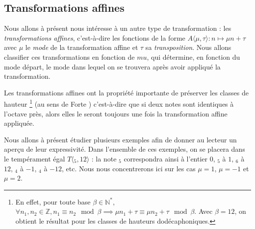 \subsection{Transformations affines}

Nous allons à présent nous intéresse à un autre type de transformation : les \emph{transformations affines}, c'est-à-dire les fonctions de la forme $A\langle\mu,\tau\rangle : n \mapsto \mu n + \tau$ avec $\mu$ le \emph{mode} de la transformation affine et $\tau$ sa \emph{transposition}. Nous allons classifier ces transformations en fonction de $mu$, qui détermine, en fonction du mode départ, le mode dans lequel on se trouvera après avoir appliqué la transformation. 

Les transformations affines ont la propriété importante de préserver les classes de hauteur \footnote{En effet, pour toute base $\beta\in \mathbb{N}^*$, $\forall n_1,n_2 \in \mathbb{Z}, n_1 \equiv n_2 \mod \beta \implies \mu n_1 + \tau \equiv \mu n_2 + \tau \mod \beta$. Avec $\beta=12$, on obtient le résultat pour les classes de hauteurs dodécaphoniques. }  (au sens de Forte \cite{forte1973structure}) c'est-à-dire que si deux notes sont identiques à l'octave près, alors elles le seront toujours une fois la transformation affine appliquée. 

Nous allons à présent étudier plusieurs exemples afin de donner au lecteur un aperçu de leur expressivité. Dans l'ensemble de ces exemples, on se placera dans le tempérament égal $T\langle $$_5,12\rangle$ : la note $_5$ correspondra ainsi à l'entier $0$, $_5$ à $1$, $_6$ à $12$, $_4$ à $-1$, $_4$ à $-12$, etc. Nous nous concentrerons ici sur les cas $\mu = 1$, $\mu = -1$ et $\mu = 2$.
